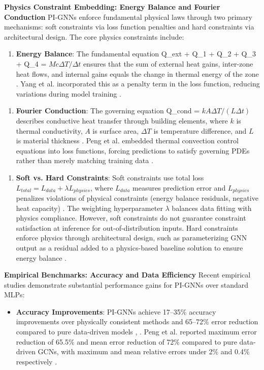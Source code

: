 \documentclass[12pt,a4paper]{article}
\begin{document}
\textbf{Physics Constraint Embedding: Energy Balance and Fourier Conduction}
PI-GNNs enforce fundamental physical laws through two primary mechanisms: soft constraints via loss function penalties and hard constraints via architectural design. The core physics constraints include:
\begin{enumerate}
  \item \textbf{Energy Balance}: The fundamental equation Q\_ext + Q\_1 + Q\_2 + Q\_3 + Q\_4 = $Mc\Delta T/\Delta t$ ensures that the sum of external heat gains, inter-zone heat flows, and internal gains equals the change in thermal energy of the zone \cite{ref179}. Yang et al. incorporated this as a penalty term in the loss function, reducing variations during model training \cite{ref179}.
\end{enumerate}
\begin{enumerate}[resume]
  \item \textbf{Fourier Conduction}: The governing equation Q\_cond = $kA\Delta T/(L\Delta t)$ describes conductive heat transfer through building elements, where $k$ is thermal conductivity, $A$ is surface area, $\Delta T$ is temperature difference, and $L$ is material thickness \cite{ref25}. Peng et al. embedded thermal convection control equations into loss functions, forcing predictions to satisfy governing PDEs rather than merely matching training data \cite{ref162}.
\end{enumerate}
\begin{enumerate}[resume]
  \item \textbf{Soft vs. Hard Constraints}: Soft constraints use total loss $L_{total} = L_{data} + \lambda L_{physics}$, where $L_{data}$ measures prediction error and $L_{physics}$ penalizes violations of physical constraints (energy balance residuals, negative heat capacity) \cite{ref26}. The weighting hyperparameter $\lambda$ balances data fitting with physics compliance. However, soft constraints do not guarantee constraint satisfaction at inference for out-of-distribution inputs. Hard constraints enforce physics through architectural design, such as parameterizing GNN output as a residual added to a physics-based baseline solution to ensure energy balance \cite{ref24}.
\end{enumerate}
\textbf{Empirical Benchmarks: Accuracy and Data Efficiency}
Recent empirical studies demonstrate substantial performance gains for PI-GNNs over standard MLPs:
\begin{itemize}
  \item \textbf{Accuracy Improvements}: PI-GNNs achieve 17--35\% accuracy improvements over physically consistent methods and 65--72\% error reduction compared to pure data-driven models \cite{ref25}, \cite{ref26}. Peng et al. reported maximum error reduction of 65.5\% and mean error reduction of 72\% compared to pure data-driven GCNs, with maximum and mean relative errors under 2\% and 0.4\% respectively \cite{ref162}.
\end{itemize}
\end{document}
